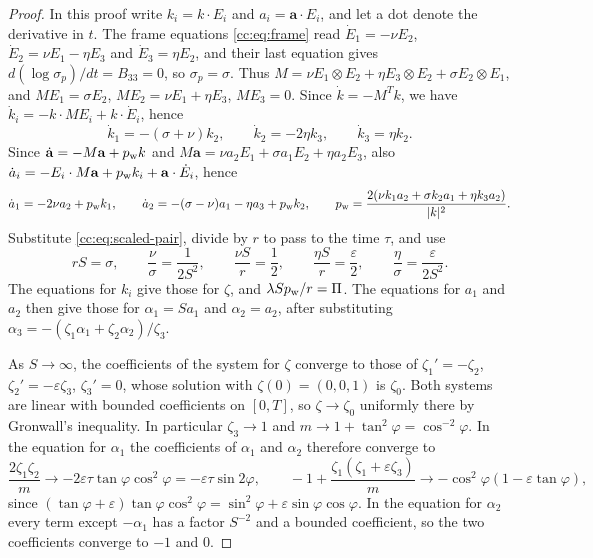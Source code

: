 \begin{proof}
In this proof write $k_i=k\cdot E_i$ and $a_i=\mathbf a\cdot E_i$, and
let a dot denote the derivative in $t$. The frame equations
\eqref{cc:eq:frame} read $\dot E_1=-\nu E_2$,
$\dot E_2=\nu E_1-\eta E_3$ and $\dot E_3=\eta E_2$, and their last
equation gives $d(\log\sigma_p)/dt=B_{33}=0$, so $\sigma_p=\sigma$. Thus
$M=\nu E_1\otimes E_2+\eta E_3\otimes E_2+\sigma E_2\otimes E_1$, and
$ME_1=\sigma E_2$, $ME_2=\nu E_1+\eta E_3$, $ME_3=0$. Since
$\dot k=-M^Tk$, we have $\dot k_i=-k\cdot ME_i+k\cdot\dot E_i$, hence
\[
 \dot k_1=-(\sigma+\nu)k_2,\qquad \dot k_2=-2\eta k_3,\qquad
 \dot k_3=\eta k_2 .
\]
Since $\dot{\mathbf a}=-M\mathbf a+p_{\rm w}k$ and
$M\mathbf a=\nu a_2E_1+\sigma a_1E_2+\eta a_2E_3$, also
$\dot a_i=-E_i\cdot M\mathbf a+p_{\rm w}k_i+\mathbf a\cdot\dot E_i$, hence
\[
 \dot a_1=-2\nu a_2+p_{\rm w}k_1,\qquad
 \dot a_2=-(\sigma-\nu)a_1-\eta a_3+p_{\rm w}k_2,\qquad
 p_{\rm w}=\frac{2(\nu k_1a_2+\sigma k_2a_1+\eta k_3a_2)}{|k|^2}.
\]
Substitute \eqref{cc:eq:scaled-pair}, divide by $r$ to pass to the time
$\tau$, and use
\[
 rS=\sigma,\qquad \frac{\nu}{\sigma}=\frac1{2S^2},\qquad
 \frac{\nu S}r=\frac12,\qquad \frac{\eta S}r=\frac\varepsilon2,\qquad
 \frac\eta\sigma=\frac{\varepsilon}{2S^2}.
\]
The equations for $k_i$ give those for $\zeta$, and
$\lambda Sp_{\rm w}/r=\Pi$. The equations for $a_1$ and $a_2$ then give
those for $\alpha_1=Sa_1$ and $\alpha_2=a_2$, after substituting
$\alpha_3=-(\zeta_1\alpha_1+\zeta_2\alpha_2)/\zeta_3$.

As $S\to\infty$, the coefficients of the system for $\zeta$ converge to
those of $\zeta_1'=-\zeta_2$, $\zeta_2'=-\varepsilon\zeta_3$,
$\zeta_3'=0$, whose solution with $\zeta(0)=(0,0,1)$ is $\zeta_0$. Both
systems are linear with bounded coefficients on $[0,T]$, so
$\zeta\to\zeta_0$ uniformly there by Gronwall's inequality. In
particular $\zeta_3\to1$ and $m\to1+\tan^2\varphi=\cos^{-2}\varphi$.
In the equation for $\alpha_1$ the coefficients of $\alpha_1$ and
$\alpha_2$ therefore converge to
\[
 \frac{2\zeta_1\zeta_2}m\to-2\varepsilon\tau\tan\varphi\cos^2\varphi
   =-\varepsilon\tau\sin2\varphi,\qquad
 -1+\frac{\zeta_1(\zeta_1+\varepsilon\zeta_3)}m
 \to-\cos^2\varphi(1-\varepsilon\tan\varphi),
\]
since $(\tan\varphi+\varepsilon)\tan\varphi\cos^2\varphi
=\sin^2\varphi+\varepsilon\sin\varphi\cos\varphi$. In the equation for
$\alpha_2$ every term except $-\alpha_1$ has a factor $S^{-2}$ and a
bounded coefficient, so the two coefficients converge to $-1$ and $0$.
\end{proof}

